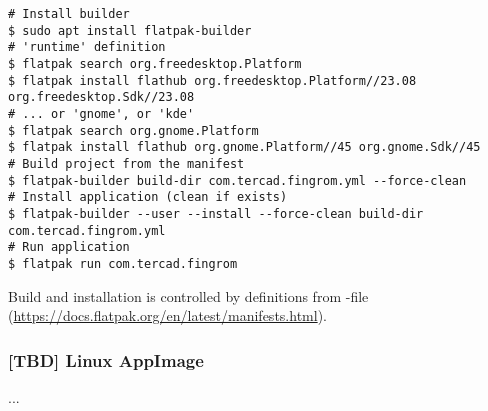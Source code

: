 \begin{lstlisting}[language=terminal]
# Install builder
$ sudo apt install flatpak-builder
# 'runtime' definition
$ flatpak search org.freedesktop.Platform
$ flatpak install flathub org.freedesktop.Platform//23.08 org.freedesktop.Sdk//23.08
# ... or 'gnome', or 'kde'
$ flatpak search org.gnome.Platform
$ flatpak install flathub org.gnome.Platform//45 org.gnome.Sdk//45
# Build project from the manifest
$ flatpak-builder build-dir com.tercad.fingrom.yml --force-clean
# Install application (clean if exists)
$ flatpak-builder --user --install --force-clean build-dir com.tercad.fingrom.yml
# Run application
$ flatpak run com.tercad.fingrom
\end{lstlisting}

\noindent Build and installation is controlled by definitions from -file
(\href{https://docs.flatpak.org/en/latest/manifests.html}{https://docs.flatpak.org/en/latest/manifests.html}).


\subsubsection{[TBD] Linux AppImage}

...
